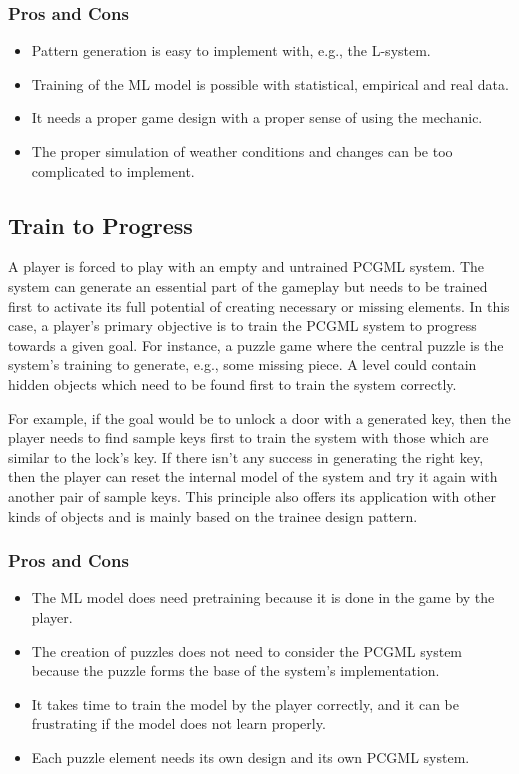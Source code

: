 \documentclass[MGS,Master,english]{twbook}%
\begin{document}
\subsubsection{Pros and Cons}
\begin{itemize}
	\item Pattern generation is easy to implement with, e.g., the L-system.
	\item Training of the ML model is possible with statistical, empirical and real data.
	\item It needs a proper game design with a proper sense of using the mechanic.
	\item The proper simulation of weather conditions and changes can be too complicated to implement.
\end{itemize}


\subsection{Train to Progress} \label{idea::trainToProgress}
A player is forced to play with an empty and untrained PCGML system. The system can generate an essential part of the gameplay but needs to be trained first to activate its full potential of creating necessary or missing elements. In this case, a player’s primary objective is to train the PCGML system to progress towards a given goal. For instance, a puzzle game where the central puzzle is the system’s training to generate, e.g., some missing piece. A level could contain hidden objects which need to be found first to train the system correctly. 

For example, if the goal would be to unlock a door with a generated key, then the player needs to find sample keys first to train the system with those which are similar to the lock's key. If there isn’t any success in generating the right key, then the player can reset the internal model of the system and try it again with another pair of sample keys. This principle also offers its application with other kinds of objects and is mainly based on the trainee design pattern.

\subsubsection{Pros and Cons}
\begin{itemize}
	\item The ML model does need pretraining because it is done in the game by the player.
	\item The creation of puzzles does not need to consider the PCGML system because the puzzle forms the base of the system's implementation.
	\item It takes time to train the model by the player correctly, and it can be frustrating if the model does not learn properly.
	\item Each puzzle element needs its own design and its own PCGML system.
\end{itemize}
\end{document}
